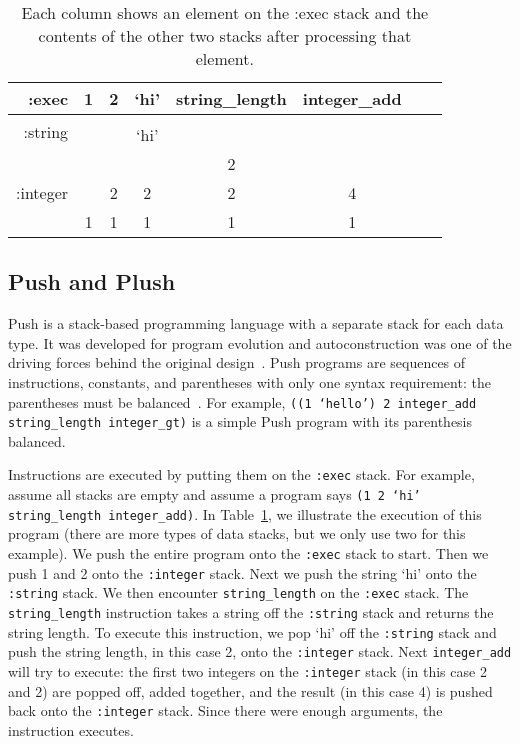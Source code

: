 \documentclass{sig-alternate}
\begin{document}
\begin{table}
	\centering
	\begin{tabular}{|r|c|c|c|c|c|c|c|}
		\hline
		:exec & 1 & 2 & `hi' & string\_length & integer\_add \\
		\hline
		\hline
		\multirow{2}{*}{:string} & & & & & \\
		& & & `hi' &  &  \\
		\hline
		\multirow{3}{*}{:integer} & & & & 2 & \\
		& & 2 & 2 & 2 & 4 \\
		& 1 & 1 & 1 & 1 & 1\\
		\hline
	\end{tabular}
	\caption{Each column shows an element on the :exec stack and the contents of the other two stacks after processing that element.}
	\label{tab:push}
\end{table}

\subsection{Push and Plush}
\label{sec:push}
Push is a stack-based programming language with a separate stack for each data type. It was developed for program evolution and autoconstruction was one of the driving forces behind the original design~\cite{spector:2016}. Push programs are sequences of instructions, constants, and parentheses with only one syntax requirement: the parentheses must be balanced~\cite{lee:2001}. For example, \texttt{((1 `hello') 2 integer\_add string\_length integer\_gt)} is a simple Push program with its parenthesis balanced.

Instructions are executed by putting them on the \texttt{:exec} stack. For example, assume all stacks are empty and assume a program says \texttt{(1 2 `hi' string\_length integer\_add)}. In Table~\ref{tab:push}, we illustrate the execution of this program (there are more types of data stacks, but we only use two for this example). We push the entire program onto the \texttt{:exec} stack to start. Then we push 1 and 2 onto the \texttt{:integer} stack. Next we push the string `hi' onto the \texttt{:string} stack. We then encounter \texttt{string\_length} on the \texttt{:exec} stack. The \texttt{string\_length} instruction takes a string off the \texttt{:string} stack and returns the string length. To execute this instruction, we pop `hi' off the \texttt{:string} stack and push the string length, in this case 2, onto the \texttt{:integer} stack. Next \texttt{integer\_add} will try to execute: the first two integers on the \texttt{:integer} stack (in this case 2 and 2) are popped off, added together, and the result (in this case 4) is pushed back onto the \texttt{:integer} stack. Since there were enough arguments, the instruction executes.~\cite{lee:tutorial}
\end{document}
